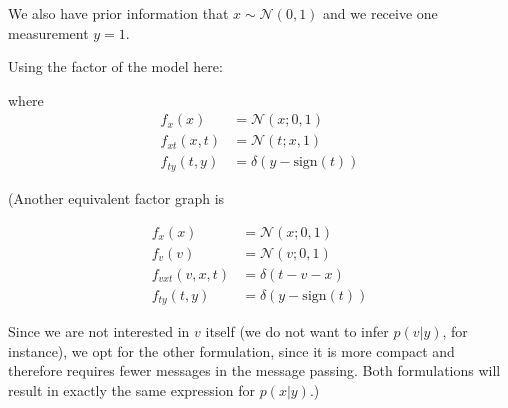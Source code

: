 \documentclass{article}
\begin{document}
\begin{enumerate}
We also have prior information that $x \sim \mathcal{N}(0, 1)$ and we receive one measurement $y = 1$.

Using the factor of the model here:
\begin{center}
\end{center}

where
\begin{align*}
f_x(x) &= \mathcal{N}(x; 0, 1)\\
f_{xt}(x, t) &= \mathcal{N}(t; x, 1)\\
f_{ty}(t, y) &= \delta(y - \text{sign}(t))
\end{align*}

(Another equivalent factor graph is
\begin{center}
\end{center}

\begin{align*}
f_x(x) &= \mathcal{N}(x; 0, 1)\\
f_v(v) &= \mathcal{N}(v; 0, 1)\\
f_{vxt}(v, x, t) &= \delta(t - v - x)\\
f_{ty}(t, y) &= \delta(y - \text{sign}(t))
\end{align*}

Since we are not interested in $v$ itself (we do not want to infer $p(v|y)$, for instance), we opt for the other
formulation, since it is more compact and therefore requires fewer messages in the message passing. Both
formulations will result in exactly the same expression for $p(x|y)$.)


\end{enumerate}
\end{document}
